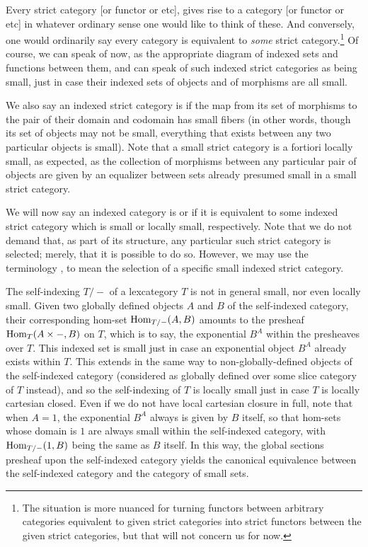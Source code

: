 Every strict category [or functor or etc], gives rise to a category [or functor or etc] in whatever ordinary sense one would like to think of these. And conversely, one would ordinarily say every category is equivalent to \emph{some} strict category.\footnote{The situation is more nuanced for turning functors between arbitrary categories equivalent to given strict categories into strict functors between the given strict categories, but that will not concern us for now.} Of course, we can speak of  now, as the appropriate diagram of indexed sets and functions between them, and can speak of such indexed strict categories as being small, just in case their indexed sets of objects and of morphisms are all small.

We also say an indexed strict category is  if the map from its set of morphisms to the pair of their domain and codomain has small fibers (in other words, though its set of objects may not be small, everything that exists between any two particular objects is small). Note that a small strict category is a fortiori locally small, as expected, as the collection of morphisms between any particular pair of objects are given by an equalizer between sets already presumed small in a small strict category.

We will now say an indexed category is  or  if it is equivalent to some indexed strict category which is small or locally small, respectively. Note that we do not demand that, as part of its structure, any particular such strict category is selected; merely, that it is possible to do so. However, we may use the terminology , to mean the selection of a specific small indexed strict category. 

The self-indexing $T/-$ of a lexcategory $T$ is not in general small, nor even locally small. Given two globally defined objects $A$ and $B$ of the self-indexed category, their corresponding hom-set $\operatorname{Hom}_{T/-}(A, B)$ amounts to the presheaf $\operatorname{Hom}_{T}(A \times -, B)$ on $T$, which is to say, the exponential $B^A$ within the presheaves over $T$. This indexed set is small just in case an exponential object $B^A$ already exists within $T$. This extends in the same way to non-globally-defined objects of the self-indexed category (considered as globally defined over some slice category of $T$ instead), and so the self-indexing of $T$ is locally small just in case $T$ is locally cartesian closed. Even if we do not have local cartesian closure in full, note that when $A = 1$, the exponential $B^A$ always is given by $B$ itself, so that hom-sets whose domain is $1$ are always small within the self-indexed category, with $\operatorname{Hom}_{T/-}(1, B)$ being the same as $B$ itself. In this way, the global sections presheaf upon the self-indexed category yields the canonical equivalence between the self-indexed category and the category of small sets.


